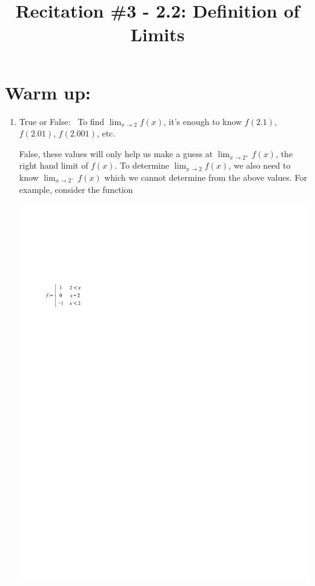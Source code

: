 \documentclass[handout,nooutcomes]{ximera}
\title{Recitation \#3 - 2.2:  Definition of Limits}
\begin{document}
\begin{abstract}		\end{abstract}
\maketitle

\section*{Warm up:} 

	\begin{enumerate}[label=(\alph*)]
	
	\item  True or False: \, To find $\lim_{x \to 2} f(x)$, it's enough to know $f(2.1)$, $f(2.01)$, $f(2.001)$, etc.
	\begin{freeResponse}
	 False, these values will only help us make a guess at $\lim_{x \to 2^+} f(x)$, the right hand limit of $f(x)$.  To determine $\lim_{x \to 2} f(x)$, we also need to know $\lim_{x \to 2^-} f(x)$ which we cannot determine from the above values.  For example, consider the function
	 	\begin{image}
	 	\includegraphics[trim= 70 570 300 165]{Figure2.pdf}
	 	\end{image}
	 	

\end{freeResponse}
\end{enumerate}
\end{document}
